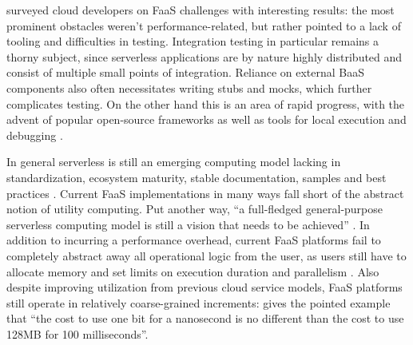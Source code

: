 \textcite{leitner18industrialpractice} surveyed cloud developers on FaaS challenges with interesting results: the most prominent obstacles weren't performance-related, but rather pointed to a lack of tooling and difficulties in testing. Integration testing in particular remains a thorny subject, since serverless applications are by nature highly distributed and consist of multiple small points of integration. Reliance on external BaaS components also often necessitates writing stubs and mocks, which further complicates testing. On the other hand this is an area of rapid progress, with the advent of popular open-source frameworks as well as tools for local execution and debugging \parencite{robert2016serverlessarchitectures}.

In general serverless is still an emerging computing model lacking in standardization, ecosystem maturity, stable documentation, samples and best practices \parencite{cncf18serverlessWG}. Current FaaS implementations in many ways fall short of the abstract notion of utility computing. Put another way, ``a full-fledged general-purpose serverless computing model is still a vision that needs to be achieved'' \parencite{buyya2017manifesto}. In addition to incurring a performance overhead, current FaaS platforms fail to completely abstract away all operational logic from the user, as users still have to allocate memory and set limits on execution duration and parallelism \parencite{van2017spec}. Also despite improving utilization from previous cloud service models, FaaS platforms still operate in relatively coarse-grained increments: \textcite{eivy2017wary} gives the pointed example that ``the cost to use one bit for a nanosecond is no different than the cost to use 128MB for 100 milliseconds''.

